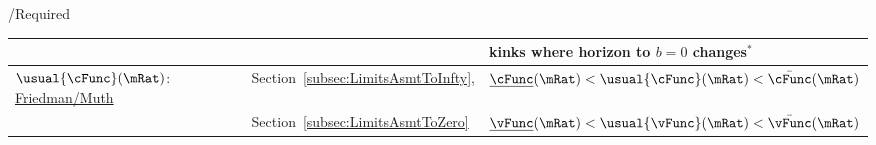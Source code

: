 \documentclass[\econtexRoot/BufferStockTheory]{subfiles}
\begin{document}
\begin{verbatimwrite}{\TableDir/Required}
\begin{table}
{\begin{tabular}{|l|l|l|}
    \\                                                                                                                        &                                         & kinks where horizon to $b=0$ changes$^{\ast}$
    \\ \hline\hline \multicolumn{1}{|l|}{$\usual{\cFunc}(\mRat)$:  \href{https://\owner.github.io/BufferStockTheory\#Uncertainty-Modified-Conditions}{Friedman/Muth}
  }                                                                                                                       & Section~\ref{subsec:LimitsAsmtToInfty}, & $\underline{\cFunc}(\mRat) < \usual{\cFunc}(\mRat) < \bar{\cFunc}(\mRat)$ %
    \\                                                                                                                      & Section~\ref{subsec:LimitsAsmtToZero}   & $\underline{\vFunc}(\mRat) < \usual{\vFunc}(\mRat) < \bar{\vFunc}(\mRat)$ %
                                                                                  

\end{tabular}}
\end{table}
\end{verbatimwrite}
\end{document}
